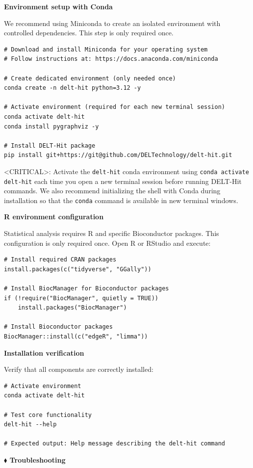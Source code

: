 \documentclass[pdflatex,sn-nature]{sn-jnl}
\newcommand{\setupitem}[1]{\par\medskip\noindent\textbf{#1}\par}
\begin{document}
\begin{tcolorbox}[
  colback=gray!10,
  colframe=gray!50,
  title=Box 1 | Installing DELT-Hit,
  fonttitle=\bfseries
]

\setupitem{Environment setup with Conda}

We recommend using Miniconda to create an isolated environment with controlled dependencies. This step is only required once.


\begin{lstlisting}
# Download and install Miniconda for your operating system
# Follow instructions at: https://docs.anaconda.com/miniconda

# Create dedicated environment (only needed once)
conda create -n delt-hit python=3.12 -y

# Activate environment (required for each new terminal session)
conda activate delt-hit
conda install pygraphviz -y

# Install DELT-Hit package
pip install git+https://git@github.com/DELTechnology/delt-hit.git
\end{lstlisting}
<CRITICAL>: Activate the \texttt{delt-hit} conda environment using \texttt{conda activate delt-hit} each time you open a new terminal session before running DELT-Hit commands. We also recommend initializing the shell with Conda during installation so that the \texttt{conda} command is available in new terminal windows. 


\setupitem{R environment configuration}

Statistical analysis requires R and specific Bioconductor packages. This configuration is only required once. Open R or RStudio and execute:


\begin{lstlisting}
# Install required CRAN packages
install.packages(c("tidyverse", "GGally"))

# Install BiocManager for Bioconductor packages
if (!require("BiocManager", quietly = TRUE))
    install.packages("BiocManager")

# Install Bioconductor packages
BiocManager::install(c("edgeR", "limma"))
\end{lstlisting}

\setupitem{Installation verification}

Verify that all components are correctly installed:


\begin{lstlisting}
# Activate environment
conda activate delt-hit

# Test core functionality
delt-hit --help

# Expected output: Help message describing the delt-hit command
\end{lstlisting}

\textbf{$\blacklozenge$ Troubleshooting}

\end{tcolorbox}
\clearpage
\end{document}
